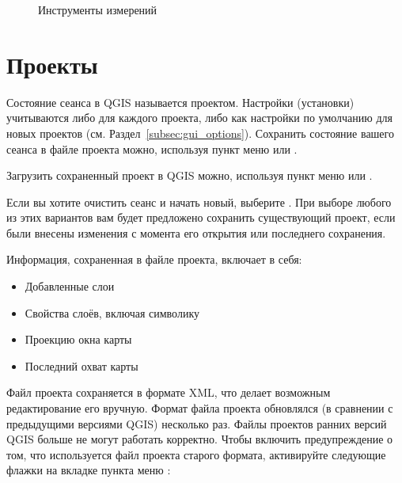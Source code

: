 \begin{figure}[ht]
\centering
     \hspace{0.33cm}
     \hspace{0.33cm}
   \caption{Инструменты измерений \wincaption} \label{fig:measure}
\end{figure}


\section{Проекты}\label{sec:projects}

Состояние сеанса в QGIS называется проектом. Настройки (установки) учитываются либо
для каждого проекта, либо как настройки по умолчанию для новых проектов
(см. Раздел~\ref{subsec:gui_options}). Сохранить состояние
вашего сеанса в файле проекта можно, используя пункт меню
 \arrow {}
или  \arrow
{}.

Загрузить сохраненный проект в QGIS можно, используя пункт меню
 \arrow {}
или  \arrow {}.

Если вы хотите очистить сеанс и начать новый, выберите 
\arrow {}. При выборе любого
из этих вариантов вам будет предложено сохранить существующий проект, если
были внесены изменения с момента его открытия или последнего сохранения.

Информация, сохраненная в файле проекта, включает в себя:

\begin{itemize}
\item Добавленные слои
\item Свойства слоёв, включая символику
\item Проекцию окна карты
\item Последний охват карты
\end{itemize}

Файл проекта сохраняется в формате XML, что делает возможным редактирование
его вручную. Формат файла проекта обновлялся (в сравнении с
предыдущими версиями QGIS) несколько раз. Файлы проектов ранних версий
QGIS больше не могут работать корректно. Чтобы включить предупреждение о том, что
используется файл проекта старого формата, активируйте следующие флажки на вкладке
 пункта меню  \arrow {}: \\

